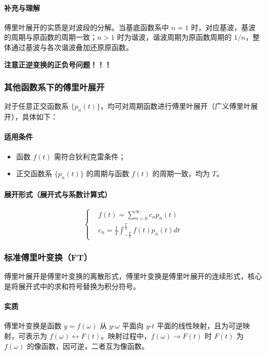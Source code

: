\documentclass{article}
\begin{document}
	\paragraph{补充与理解}
	傅里叶展开的实质是对波段的分解。当基底函数系中 \( n = 1 \) 时，对应基波，基波的周期与原函数的周期一致；\( n > 1 \) 时为谐波，谐波周期为原函数周期的 \( 1/n \)，整体通过基波与各次谐波叠加还原原函数。
	
	\textbf{注意正逆变换的正负号问题！！！}
	\subsubsection{其他函数系下的傅里叶展开}
	对于任意正交函数系 \( \{p_n(t)\} \)，均可对周期函数进行傅里叶展开（广义傅里叶展开），具体如下：
	
	\paragraph{适用条件}
	\begin{itemize}
		\item 函数 \( f(t) \) 需符合狄利克雷条件；
		\item 正交函数系 \( \{p_n(t)\} \) 的周期与函数 \( f(t) \) 的周期一致，均为 \( T \)。
	\end{itemize}
	
	\paragraph{展开形式（展开式与系数计算式）}
	\[
	\left\{
	\begin{aligned}
		&f(t) = \sum_{n = 0}^{\infty} c_n p_n(t) \\
		&c_n = \frac{1}{T} \int_{-\frac{T}{2}}^{\frac{T}{2}} f(t) p_n(t) dt
	\end{aligned}
	\right.
	\]
	
	\subsubsection{标准傅里叶变换（FT）}
	傅里叶展开是傅里叶变换的离散形式，傅里叶变换是傅里叶展开的连续形式，核心是将展开式中的求和符号替换为积分符号。
	
	\paragraph{实质}
	傅里叶变换是函数 \( y = f(\omega) \) 从 \( y\text{-}\omega \) 平面向 \( y\text{-}t \) 平面的线性映射，且为可逆映射，可表示为 \( f(\omega) \leftrightarrow F(t) \)。映射过程中，\( f(\omega) \to F(t) \) 时 \( F(t) \) 为 \( f(\omega) \) 的像函数，因可逆，二者互为像函数。
	
\end{document}
